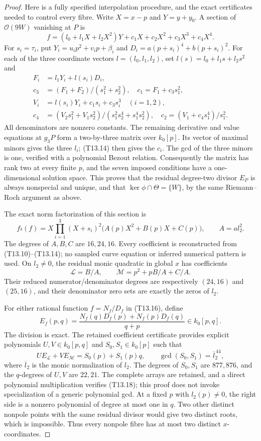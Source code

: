 \begin{proof}
Here is a fully specified interpolation procedure, and the exact
certificates needed to control every fibre. Write $X=x-p$ and
$Y=y+y_0$. A section of $\mathcal O(9W)$ vanishing at $P$ is
\[
 f=(l_0+l_1X+l_2X^2)Y+c_1X+c_2X^2+c_3X^3+c_4X^4.
\tag{T13.13}
\]
For $s_i=\tau_i$, put $Y_i=u_ip^2+v_ip+\beta_i$ and
$D_i=a(p+s_i)^4+b(p+s_i)^2$. For each of the three coordinate
vectors $l=(l_0,l_1,l_2)$, set $l(s)=l_0+l_1s+l_2s^2$ and
\[
\begin{aligned}
 F_i&=l_1Y_i+l(s_i)D_i,\\
 c_3&=(F_1+F_2)/(s_1^2+s_2^2),\quad c_1=F_1+c_3s_1^2,\\
 V_i&=l(s_i)Y_i+c_1s_i+c_3s_i^3\quad(i=1,2),\\
 c_4&=(V_2s_1^2+V_1s_2^2)/(s_1^2s_2^4+s_1^4s_2^2),\quad
 c_2=(V_1+c_4s_1^4)/s_1^2.
\end{aligned}
\tag{T13.14}
\]
All denominators are nonzero constants. The remaining derivative
and value equations at $g_3P$ form a two-by-three matrix over
$k_0[p]$. Its vector of maximal minors gives the three $l_i$;
(T13.14) then gives the $c_i$. The gcd of the three minors is one,
verified with a polynomial Bezout relation. Consequently the matrix
has rank two at every finite $p$, and the seven imposed conditions
have a one-dimensional solution space. This proves that the residual
degree-two divisor $E_P$ is always nonspecial and unique, and that
$\ker\phi\cap\Theta=\{W\}$, by the same Riemann--Roch argument
as above.

The exact norm factorization of this section is
\[
 f\iota(f)=X\prod_{i=1}^3(X+s_i)^2
                 \bigl(A(p)X^2+B(p)X+C(p)\bigr),
 \qquad A=a l_2^2.
\tag{T13.15}
\]
The degrees of $A,B,C$ are $16,24,16$. Every coefficient is
reconstructed from (T13.10)--(T13.14); no sampled curve equation
or inferred numerical pattern is used. On $l_2\ne0$, the residual
monic quadratic in global $x$ has coefficients
\[
 \mathcal L=B/A,\qquad
 \mathcal M=p^2+pB/A+C/A.
\tag{T13.16}
\]
Their reduced numerator/denominator degrees are respectively
$(24,16)$ and $(25,16)$, and their denominator zero sets are
exactly the zeros of $l_2$.

For either rational function $f=N_f/D_f$ in (T13.16), define
\[
 E_f(p,q)=
 \frac{N_f(q)D_f(p)+N_f(p)D_f(q)}{q+p}\in k_0[p,q].
\tag{T13.17}
\]
The division is exact. The retained coefficient certificate provides
explicit polynomials $U,V\in k_0[p,q]$ and $S_0,S_1\in k_0[p]$
such that
\[
 UE_{\mathcal L}+VE_{\mathcal M}=S_0(p)+S_1(p)q,
 \qquad \gcd(S_0,S_1)=\overline l_2^{\,44},
\tag{T13.18}
\]
where $\overline l_2$ is the monic normalization of $l_2$.
The degrees of $S_0,S_1$ are $877,876$, and the $q$-degrees of
$U,V$ are $22,21$. The complete arrays are retained, and a direct
polynomial multiplication verifies (T13.18); this proof does not
invoke specialization of a generic polynomial gcd. At a fixed
$p$ with $l_2(p)\ne0$, the right side is a nonzero polynomial
of degree at most one in $q$. Two other distinct nonpole points
with the same residual divisor would give two distinct roots,
which is impossible. Thus every nonpole fibre has at most two
distinct $x$-coordinates.


\end{proof}

